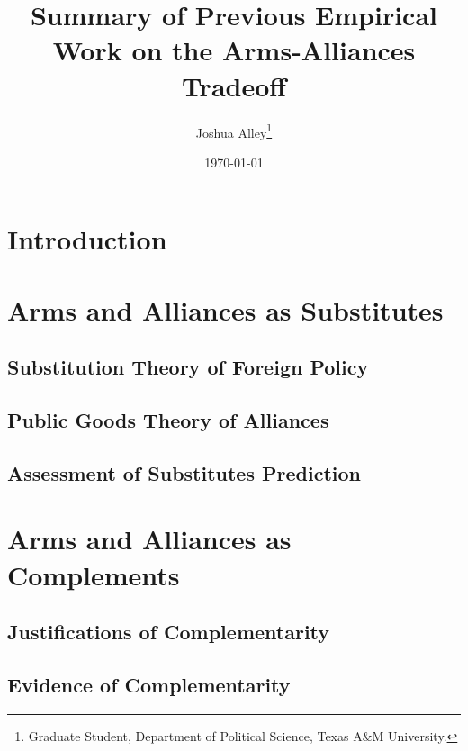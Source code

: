 \documentclass[12pt]{article}
\title{\textbf{Summary of Previous Empirical Work on the Arms-Alliances Tradeoff}}
\author{Joshua Alley\footnote{Graduate Student,
Department of Political Science, Texas A\&M University.}}
\date{{\normalsize \today}}
\begin{document}
\maketitle 


\section{Introduction}







\section{Arms and Alliances as Substitutes}



\subsection{Substitution Theory of Foreign Policy}




\subsection{Public Goods Theory of Alliances} 




\subsection{Assessment of Substitutes Prediction}





\section{Arms and Alliances as Complements}



\subsection{Justifications of Complementarity} 





\subsection{Evidence of Complementarity} 
\end{document}
